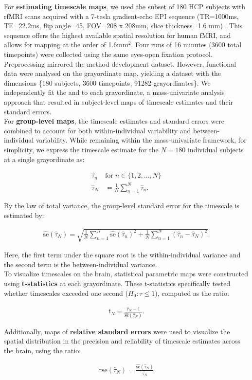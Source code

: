 \documentclass[main.tex]{subfiles}
\begin{document}
For \textbf{estimating timescale maps}, we used the subset of 180 HCP subjects with rfMRI scans acquired with a 7-tesla gradient-echo EPI sequence (TR=1000ms, TE=22.2ms, flip angle=45\textdegree, FOV=208 x 208mm, slice thickness=1.6 mm) \citep{van_essen_wu-minn_2013, moeller_multiband_2010}. This sequence offers the highest available spatial resolution for human fMRI, and allows for mapping at the order of 1.6mm$^2$. Four runs of 16 minutes (3600 total timepoints) were collected using the same eyes-open fixation protocol. Preprocessing mirrored the method development dataset. However, functional data were analysed on the grayordinate map, yielding a dataset with the dimensions \{180 subjects, 3600 timepoints, 91282 grayordinates\}. We independently fit the  and  to each grayordinate, a mass-univariate analysis approach that resulted in subject-level maps of timescale estimates and their standard errors.\\

For \textbf{group-level maps}, the timescale estimates and standard errors were combined to account for both within-individual variability and between-individual variability. While remaining within the mass-univariate framework, for simplicity, we express the timescale estimate for the $N=180$ individual subjects at a single grayordinate as:

\begin{align}
    \hat\tau_n \; &\text{for} \; n\in\{1, 2, ..., N\}\\
    \hat\tau_N &= \frac{1}{N} \sum_{n=1}^N \hat\tau_n.
\end{align}

\noindent By the law of total variance, the group-level standard error for the timescale is estimated by:

\begin{align}
    \widehat{\text{se}}(\hat\tau_N) = \sqrt{\frac{1}{N} \sum_{n=1}^N \widehat{\text{se}}(\hat\tau_n)^2 + \frac{1}{N} \sum_{n=1}^N (\hat\tau_n - \hat\tau_N)^2}.
\end{align}

\noindent Here, the first term under the square root is the within-individual variance and the second term is the between-individual variance.\\

To visualize timescales on the brain, statistical parametric maps were constructed using \textbf{t-statistics} at each grayordinate. These t-statistics specifically tested whether timescales exceeded one second  ($H_0: \tau \le 1$), computed as the ratio:

\begin{align}
    t_N = \frac{\hat\tau_N-1}{\widehat{\text{se}}(\hat\tau_N)}.
\end{align}

\noindent Additionally, maps of \textbf{relative standard errors} were used to visualize the spatial distribution in the precision and reliability of timescale estimates across the brain, using the ratio:

\begin{align}
    \text{rse}(\hat\tau_N) = \frac{\widehat{\text{se}}(\hat\tau_N)}{\hat\tau_N}
\end{align}
\end{document}
